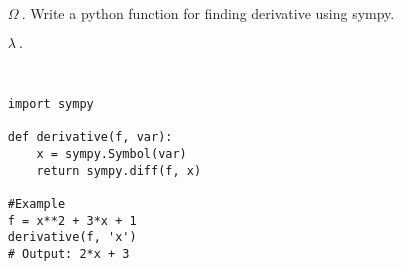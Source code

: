 \documentclass{article}
\begin{document}
\ttfamily
\sloppy
\vspace*{\fill}
\begin{itemize}
	\item[\textcolor{REDD}{$\Omega ~.$}]\textcolor{REDD}{Write a python function for finding derivative using sympy.}

	\item[\textcolor{black}{$\lambda ~.$}]
\begin{verbatim}


import sympy

def derivative(f, var):
    x = sympy.Symbol(var)
    return sympy.diff(f, x)

#Example
f = x**2 + 3*x + 1
derivative(f, 'x')
# Output: 2*x + 3
\end{verbatim}
\end{itemize}
\vspace*{\fill}
\end{document}
